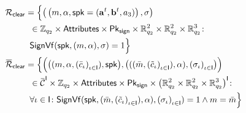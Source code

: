 	\small
	\begin{align*}
&\relationclear = \Big\{
		\big(\left(\ElemLangrelationclear\right), \signature \big) \\
&\hspace{1cm}\in \SetInstanciationMessSign \times \SetInstanciationAttrAC \times
	\SetInstanciationPublicKeysSign \times \SetInstanciationSignaturesSign \colon \\
&\hspace{1cm}\SignVf(\spk, (m, \alpha), \signature)   = 1 \Big\} \\
&\barrelationclear = \Big\{
	\Big(\big(\ElemLangbarrelationclear\big), \big( ((\bar{m}, {(\tilde{c}_\iota)}_{\iota \in
					\II}), \alpha), {(\signature_\iota)}_{\iota \in \II}\big)\Big) \\
&\hspace{1cm}\in \SetInstanciationRelMessSign \times \SetInstanciationAttrAC \times 
	\SetInstanciationPublicKeysSign \times \SetInstanciationRelSignaturesSign \colon \\ 
&\hspace{1cm}\forall \iota \in \II \colon\SignVf(\spk, (\bar{m}, {(\tilde{c}_\iota)}_{\iota \in
\II}), \alpha),  {(\signature_\iota)}_{\iota \in \II})  = 1 %
\land  m = \bar{m}
\Big\} \\
\end{align*}
\normalsize
